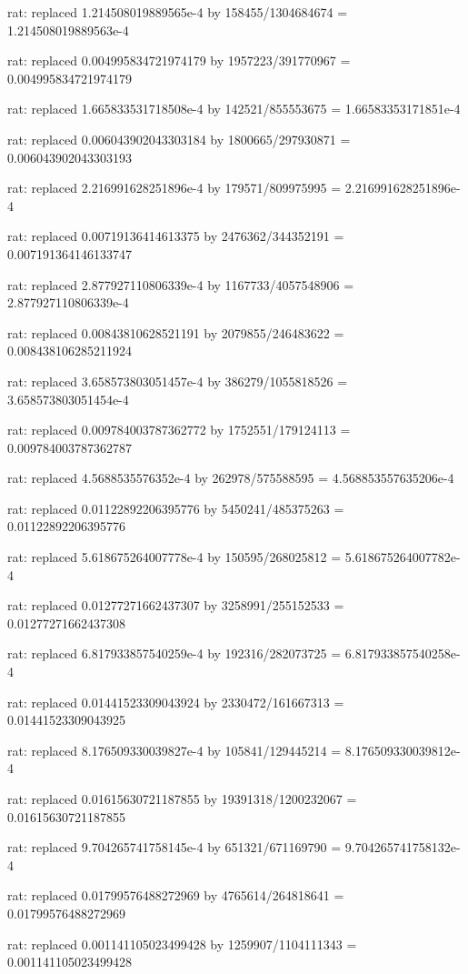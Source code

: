 \documentclass[a4paper,10pt]{article}
\begin{document}
\begin{eulernotebook}
\begin{eulercomment}
\begin{eulercomment}
\begin{eulercomment}
\begin{eulercomment}
\begin{eulercomment}
\begin{eulercomment}
\begin{eulercomment}
\begin{eulercomment}
\begin{eulercomment}
\begin{eulercomment}
\begin{eulercomment}
\begin{eulercomment}
\begin{eulercomment}
\begin{eulercomment}
\begin{eulercomment}
\begin{eulercomment}
\begin{euleroutput}
  rat: replaced 1.214508019889565e-4 by 158455/1304684674 = 1.214508019889563e-4
  
  rat: replaced 0.004995834721974179 by 1957223/391770967 = 0.004995834721974179
  
  rat: replaced 1.665833531718508e-4 by 142521/855553675 = 1.66583353171851e-4
  
  rat: replaced 0.006043902043303184 by 1800665/297930871 = 0.006043902043303193
  
  rat: replaced 2.216991628251896e-4 by 179571/809975995 = 2.216991628251896e-4
  
  rat: replaced 0.00719136414613375 by 2476362/344352191 = 0.007191364146133747
  
  rat: replaced 2.877927110806339e-4 by 1167733/4057548906 = 2.877927110806339e-4
  
  rat: replaced 0.00843810628521191 by 2079855/246483622 = 0.008438106285211924
  
  rat: replaced 3.658573803051457e-4 by 386279/1055818526 = 3.658573803051454e-4
  
  rat: replaced 0.009784003787362772 by 1752551/179124113 = 0.009784003787362787
  
  rat: replaced 4.5688535576352e-4 by 262978/575588595 = 4.568853557635206e-4
  
  rat: replaced 0.01122892206395776 by 5450241/485375263 = 0.01122892206395776
  
  rat: replaced 5.618675264007778e-4 by 150595/268025812 = 5.618675264007782e-4
  
  rat: replaced 0.01277271662437307 by 3258991/255152533 = 0.01277271662437308
  
  rat: replaced 6.817933857540259e-4 by 192316/282073725 = 6.817933857540258e-4
  
  rat: replaced 0.01441523309043924 by 2330472/161667313 = 0.01441523309043925
  
  rat: replaced 8.176509330039827e-4 by 105841/129445214 = 8.176509330039812e-4
  
  rat: replaced 0.01615630721187855 by 19391318/1200232067 = 0.01615630721187855
  
  rat: replaced 9.704265741758145e-4 by 651321/671169790 = 9.704265741758132e-4
  
  rat: replaced 0.01799576488272969 by 4765614/264818641 = 0.01799576488272969
  
  rat: replaced 0.001141105023499428 by 1259907/1104111343 = 0.001141105023499428
  

\end{euleroutput}
\end{eulercomment}
\end{eulercomment}
\end{eulercomment}
\end{eulercomment}
\end{eulercomment}
\end{eulercomment}
\end{eulercomment}
\end{eulercomment}
\end{eulercomment}
\end{eulercomment}
\end{eulercomment}
\end{eulercomment}
\end{eulercomment}
\end{eulercomment}
\end{eulercomment}
\end{eulercomment}
\end{eulernotebook}
\end{document}
